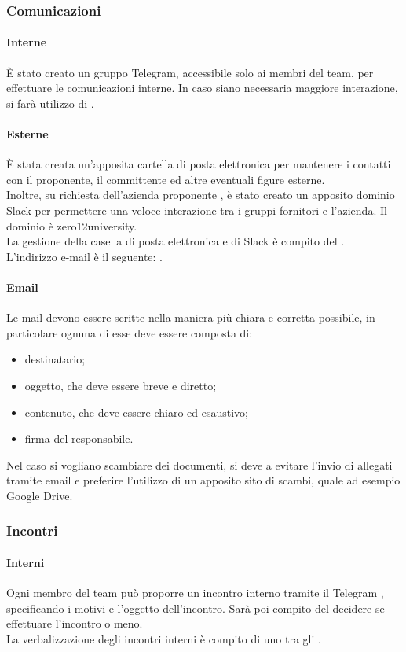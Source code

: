 \subsubsection{Comunicazioni}
 \paragraph{Interne}
 È stato creato un gruppo Telegram, accessibile solo ai membri del team, per effettuare le comunicazioni interne. In caso siano necessaria maggiore interazione, si farà utilizzo di .
 \paragraph{Esterne}
 È stata creata un'apposita cartella di posta elettronica per mantenere i contatti con il proponente, il committente ed altre eventuali figure esterne.\\
  Inoltre, su richiesta dell'azienda proponente \PROPONENTE, è stato creato un apposito dominio Slack per permettere una veloce interazione tra i gruppi fornitori e l'azienda. Il dominio è zero12university. \\
 La gestione della casella di posta elettronica e di Slack è compito del \RESP. \\
 L'indirizzo e-mail è il seguente: \EMAIL.
 \paragraph{Email}
 Le mail devono essere scritte nella maniera più chiara e corretta possibile, in particolare ognuna di esse deve essere composta di:
 \begin{itemize}
 	\item destinatario;
 	\item oggetto, che deve essere breve e diretto;
	\item contenuto, che deve essere chiaro ed esaustivo;
	\item firma del responsabile.
 \end{itemize}
 Nel caso si vogliano scambiare dei documenti, si deve a evitare l'invio di allegati tramite email e preferire l'utilizzo di un apposito sito di scambi, quale ad esempio Google Drive.
\subsubsection{Incontri}
 \paragraph{Interni}
 Ogni membro del team può proporre un incontro interno tramite il  Telegram , specificando i motivi e l'oggetto dell'incontro.
 Sarà poi compito del \RESP{} decidere se effettuare l'incontro o meno.\\
  La verbalizzazione degli incontri interni è compito di uno tra gli \AMMP.
